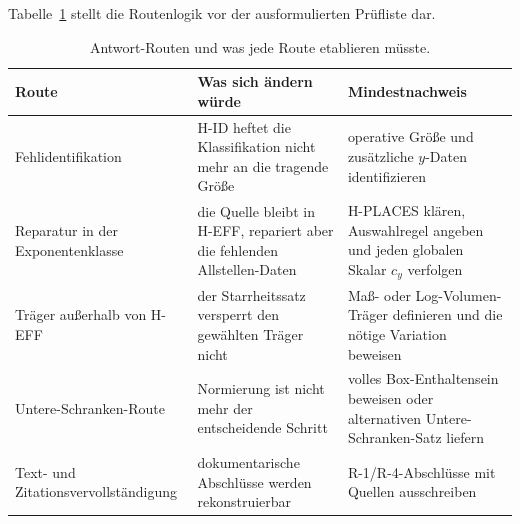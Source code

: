 \documentclass[11pt,a4paper]{article}
\theoremstyle{definition}
\theoremstyle{remark}
\begin{document}
Tabelle~\ref{tab:response-routes} stellt die Routenlogik vor der
ausformulierten Prüfliste dar.

\begin{table}[htbp]
\centering
\small
\caption{Antwort-Routen und was jede Route etablieren müsste.}
\label{tab:response-routes}
\begin{tabularx}{\textwidth}{@{}>{\raggedright\arraybackslash}p{} >{\raggedright\arraybackslash}p{} >{\raggedright\arraybackslash}X@{}}
\toprule
Route & Was sich ändern würde & Mindestnachweis \\
\midrule
Fehlidentifikation & H-ID heftet die Klassifikation nicht mehr an die
tragende Größe & operative Größe und zusätzliche $y$-Daten identifizieren \\
Reparatur in der Exponentenklasse & die Quelle bleibt in H-EFF, repariert
aber die fehlenden Allstellen-Daten & H-PLACES klären, Auswahlregel angeben
und jeden globalen Skalar $c_y$ verfolgen \\
Träger außerhalb von H-EFF & der Starrheitssatz versperrt den gewählten
Träger nicht & Maß- oder Log-Volumen-Träger definieren und die nötige
Variation beweisen \\
Untere-Schranken-Route & Normierung ist nicht mehr der entscheidende
Schritt & volles Box-Enthaltensein beweisen oder alternativen
Untere-Schranken-Satz liefern \\
Text- und Zitationsvervollständigung & dokumentarische Abschlüsse werden
rekonstruierbar & R-1/R-4-Abschlüsse mit Quellen ausschreiben \\
\bottomrule
\end{tabularx}
\end{table}
\end{document}
